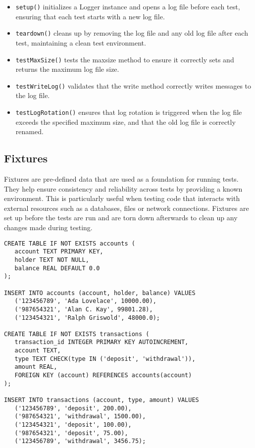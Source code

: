 \documentclass[letterpaper,12pt]{article}
\begin{document}
\begin{itemize}
   \item \texttt{setup()} initializes a Logger instance and opens a log file before each test, ensuring that each test starts with a new log file.
   \item \texttt{teardown()} cleans up by removing the log file and any old log file after each test, maintaining a clean test environment.
   \item \texttt{testMaxSize()} tests the maxsize method to ensure it correctly sets and returns the maximum log file size.
   \item \texttt{testWriteLog()} validates that the write method correctly writes messages to the log file.
   \item \texttt{testLogRotation()} ensures that log rotation is triggered when the log file exceeds the specified maximum size, and that the old log file is correctly renamed.
\end{itemize}

\newpage\subsection{Fixtures}

Fixtures are pre-defined data that are used as a foundation for running tests. They help ensure consistency and reliability across tests by providing a known environment. This is particularly useful when testing code that interacts with external resources such as a databases, files or network connections. Fixtures are set up before the tests are run and are torn down afterwards to clean up any changes made during testing.

\bigskip{}
\begin{verbatim}
CREATE TABLE IF NOT EXISTS accounts (
   account TEXT PRIMARY KEY,
   holder TEXT NOT NULL,
   balance REAL DEFAULT 0.0
);

INSERT INTO accounts (account, holder, balance) VALUES
   ('123456789', 'Ada Lovelace', 10000.00),
   ('987654321', 'Alan C. Kay', 99801.28),
   ('123454321', 'Ralph Griswold', 48000.0);

CREATE TABLE IF NOT EXISTS transactions (
   transaction_id INTEGER PRIMARY KEY AUTOINCREMENT,
   account TEXT,
   type TEXT CHECK(type IN ('deposit', 'withdrawal')),
   amount REAL,
   FOREIGN KEY (account) REFERENCES accounts(account)
);

INSERT INTO transactions (account, type, amount) VALUES
   ('123456789', 'deposit', 200.00),
   ('987654321', 'withdrawal', 1500.00),
   ('123454321', 'deposit', 100.00),
   ('987654321', 'deposit', 75.00),
   ('123456789', 'withdrawal', 3456.75);
\end{verbatim}
\end{document}
